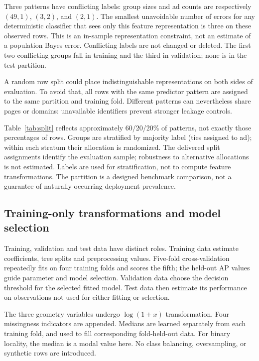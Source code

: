 \documentclass[11pt,a4paper]{article}
\begin{document}
Three patterns have conflicting labels: group sizes and ad counts are respectively $(49,1)$, $(3,2)$, and $(2,1)$. The smallest unavoidable number of errors for any deterministic classifier that sees only this feature representation is three on these observed rows. This is an in-sample representation constraint, not an estimate of a population Bayes error. Conflicting labels are not changed or deleted. The first two conflicting groups fall in training and the third in validation; none is in the test partition.

A random row split could place indistinguishable representations on both sides of evaluation. To avoid that, all rows with the same predictor pattern are assigned to the same partition and training fold. Different patterns can nevertheless share pages or domains: unavailable identifiers prevent stronger leakage controls.

\begin{table}[H]\centering
\caption{Fixed grouped partition, with class counts measured after allocation.}
\label{tab:split}
\end{table}
Table~\ref{tab:split} reflects approximately 60/20/20\% of patterns, not exactly those percentages of rows. Groups are stratified by majority label (ties assigned to ad); within each stratum their allocation is randomized. The delivered split assignments identify the evaluation sample; robustness to alternative allocations is not estimated. Labels are used for stratification, not to compute feature transformations. The partition is a designed benchmark comparison, not a guarantee of naturally occurring deployment prevalence.

\subsection{Training-only transformations and model selection}
Training, validation and test data have distinct roles. Training data estimate coefficients, tree splits and preprocessing values. Five-fold cross-validation repeatedly fits on four training folds and scores the fifth; the held-out AP values guide parameter and model selection. Validation data choose the decision threshold for the selected fitted model. Test data then estimate its performance on observations not used for either fitting or selection.

The three geometry variables undergo $\log(1+x)$ transformation. Four missingness indicators are appended. Medians are learned separately from each training fold, and used to fill corresponding fold-held-out data. For binary locality, the median is a modal value here. No class balancing, oversampling, or synthetic rows are introduced.
\end{document}
